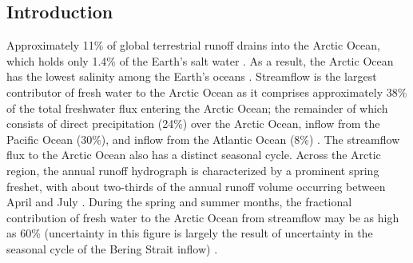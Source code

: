 \documentclass[jgrga, draft]{agutex}
\begin{document}
\begin{article}

%
%

\section{Introduction}
\label{sec:intro}
Approximately 11\% of global terrestrial runoff drains into the Arctic Ocean, which holds only 1.4\% of the Earth's salt water \citep{Lewis_2000,Lammers_2001}.
As a result, the Arctic Ocean has the lowest salinity among the Earth's oceans \citep[e.g.][]{Steele_2001}.
Streamflow is the largest contributor of fresh water to the Arctic Ocean as it comprises approximately 38\% of the total freshwater flux entering the Arctic Ocean; the remainder of which consists of direct precipitation (24\%) over the Arctic Ocean, inflow from the Pacific Ocean (30\%), and inflow from the Atlantic Ocean (8\%) \citep{Serreze_2006}.
The streamflow flux to the Arctic Ocean also has a distinct seasonal cycle.
Across the Arctic region, the annual runoff hydrograph is characterized by a prominent spring freshet, with about two-thirds of the annual runoff volume occurring between April and July \citep{Lammers_2001}.
During the spring and summer months, the fractional contribution of fresh water to the Arctic Ocean from streamflow may be as high as 60\% (uncertainty in this figure is largely the result of uncertainty in the seasonal cycle of the Bering Strait inflow) \citep{Serreze_2006}.


\end{article}
\end{document}
